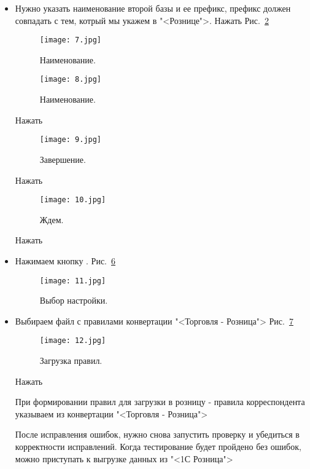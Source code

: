 \begin{itemize}
	\begin{figure}[H]
		\texttt{[image: 6.jpg]}
		\caption{Путь.}
		\label{ris:6.jpg}
	\end{figure}
	Нажать 
	Нажать 
	Нажать 

	\item Нужно указать наименование второй базы и ее префикс, префикс должен совпадать с тем, котрый мы укажем в "<Рознице">.
	Нажать 
	Рис.~\ref{ris:7.jpg}	
	\begin{figure}[H]
		\texttt{[image: 7.jpg]}
		\caption{Наименование.}
		\label{ris:7.jpg}
	\end{figure}

	\begin{figure}[H]
		\texttt{[image: 8.jpg]}
		\caption{Наименование.}
		\label{ris:8.jpg}
	\end{figure}
	Нажать 

	\begin{figure}[H]
		\texttt{[image: 9.jpg]}
		\caption{Завершение.}
		\label{ris:9.jpg}
	\end{figure}
	Нажать 
	\begin{figure}[H]
		\texttt{[image: 10.jpg]}
		\caption{Ждем.}
		\label{ris:10.jpg}
	\end{figure}
	Нажать 
	
\par	
	\item Нажимаем кнопку .
	Рис.~\ref{ris:11.jpg}	
	\begin{figure}[H]
		\texttt{[image: 11.jpg]}
		\caption{Выбор настройки.}
		\label{ris:11.jpg}
	\end{figure}
	
	\item {}
	Выбираем файл с правилами конвертации "<Торговля - Розница">
	Рис.~\ref{ris:12.jpg}	
	\begin{figure}[H]
		\texttt{[image: 12.jpg]}
		\caption{Загрузка правил.}
		\label{ris:12.jpg}
	\end{figure}
	Нажать 
	
	При формировании правил для загрузки в розницу - правила корреспондента указываем из конвертации "<Торговля - Розница">
	
\par
После исправления ошибок,  нужно снова запустить проверку и убедиться в корректности исправлений. 
Когда тестирование будет пройдено без ошибок, можно приступать к выгрузке данных из "<1С Розница">
	
\end{itemize}

